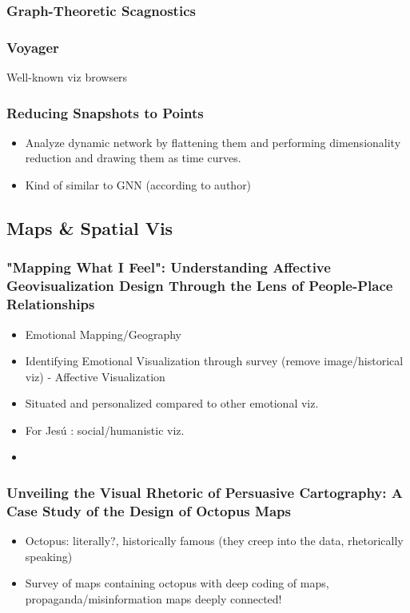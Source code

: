\documentclass[a4paper]{article}
\begin{document}
\subsubsection{Graph-Theoretic Scagnostics}
\subsubsection{Voyager}
Well-known viz browsers
\subsubsection{Reducing Snapshots to Points}
\begin{itemize}
    \item Analyze dynamic network by flattening them and performing dimensionality reduction and drawing them as time curves.
    \item Kind of similar to GNN (according to author)
\end{itemize}

\subsection{Maps \& Spatial Vis}

\subsubsection{"Mapping What I Feel": Understanding Affective Geovisualization Design Through the Lens of People-Place Relationships}

\begin{itemize}
    \item Emotional Mapping/Geography
    \item Identifying Emotional Visualization through survey (remove image/historical viz) - Affective Visualization
    \item Situated and personalized compared to other emotional viz.
    \item For Jes\'u : social/humanistic viz.
    \item
\end{itemize}

\subsubsection{Unveiling the Visual Rhetoric of Persuasive Cartography: A Case Study of the Design of Octopus Maps}
\begin{itemize}
    \item Octopus: literally?, historically famous (they creep into the data, rhetorically speaking)
    \item Survey of maps containing octopus with deep coding of maps, propaganda/misinformation maps deeply connected!
\end{itemize}
\end{document}
